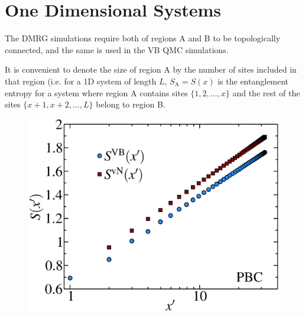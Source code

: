 \section{One Dimensional Systems}

The DMRG simulations require both of regions A and B to be topologically connected, and the 
same  is used in the VB QMC simulations.

It is convenient to denote the size of region A by the number of sites included in that region 
(i.e. for a 1D system of length $L$, $S_{\text{A}} = S(x)$ is the entanglement entropy for a system where region A contains sites $\{1,2,\dots,x\}$ and the rest of the sites $\{x+1,x+2,\dots,L\}$
belong to region B.



\begin{figure} {
\includegraphics[width=4.5in]{./figures/paper1/figure1/thesis_pbc.eps} 
\centering
\caption[1D PBC Results for VB EE and von Neumann EE]{
} }
\end{figure}

